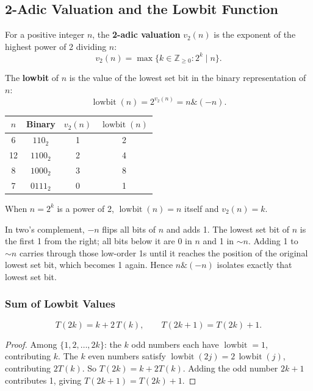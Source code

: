 \subsection{2-Adic Valuation and the Lowbit Function}

\begin{definition}
For a positive integer $n$, the \textbf{2-adic valuation} $v_2(n)$ is the exponent of the highest power of 2 dividing $n$:
\[
v_2(n) = \max\{k \in \mathbb{Z}_{\ge 0} : 2^k \mid n\}.
\]
\end{definition}

\begin{definition}[Lowbit]
The \textbf{lowbit} of $n$ is the value of the lowest set bit in the binary representation of $n$:
\[
\operatorname{lowbit}(n) = 2^{v_2(n)} = n \mathbin{\&} (-n).
\]
\end{definition}

\begin{example}
\begin{center}
\begin{tabular}{cccc}
$n$ & Binary & $v_2(n)$ & $\operatorname{lowbit}(n)$ \\
\hline
6 & $110_2$ & 1 & 2 \\
12 & $1100_2$ & 2 & 4 \\
8 & $1000_2$ & 3 & 8 \\
7 & $0111_2$ & 0 & 1 \\
\end{tabular}
\end{center}
When $n = 2^k$ is a power of 2, $\operatorname{lowbit}(n) = n$ itself and $v_2(n) = k$.
\end{example}

\begin{remark}
In two's complement, $-n$ flips all bits of $n$ and adds 1. The lowest set bit of $n$ is the first 1 from the right; all bits below it are 0 in $n$ and 1 in $\sim n$. Adding 1 to $\sim n$ carries through those low-order 1s until it reaches the position of the original lowest set bit, which becomes 1 again. Hence $n \mathbin{\&} (-n)$ isolates exactly that lowest set bit.
\end{remark}

\subsubsection*{Sum of Lowbit Values}

\begin{theorem}[Recurrence for $T(N) = \sum_{m=1}^{N} \operatorname{lowbit}(m)$]
\[
T(2k) = k + 2\,T(k), \qquad T(2k+1) = T(2k) + 1.
\]
\end{theorem}
\begin{proof}
Among $\{1, 2, \ldots, 2k\}$: the $k$ odd numbers each have $\operatorname{lowbit} = 1$, contributing $k$. The $k$ even numbers satisfy $\operatorname{lowbit}(2j) = 2\,\operatorname{lowbit}(j)$, contributing $2T(k)$. So $T(2k) = k + 2T(k)$. Adding the odd number $2k+1$ contributes 1, giving $T(2k+1) = T(2k)+1$.
\end{proof}

